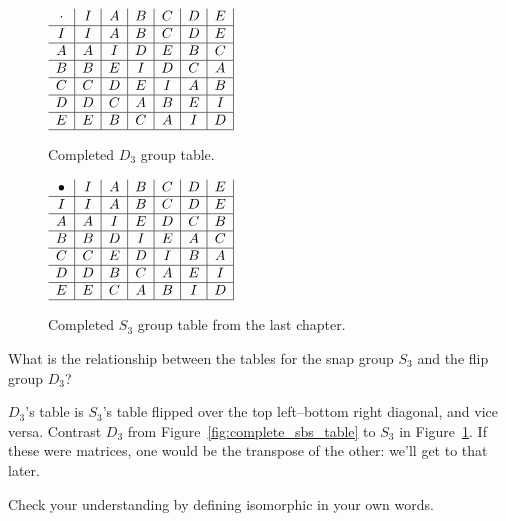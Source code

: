 \documentclass[../gatm_answers.tex]{subfiles}
\begin{document}
\begin{figure}[h]
\begin{minipage}{0.45\textwidth}
\centering
$\begin{array}{c|c|c|c|c|c|c|}
\cdot & I & A & B & C & D & E \\ \hline
I & I & A & B & C & D & E \\ \hline
A & A & I & D & E & B & C \\ \hline
B & B & E & I & D & C & A \\ \hline
C & C & D & E & I & A & B \\ \hline
D & D & C & A & B & E & I \\ \hline
E & E & B & C & A & I & D \\ \hline
\end{array}$
\caption{Completed $D_3$ group table.}
\label{fig:complete_sbs_table}
\end{minipage}\hfill
\begin{minipage}{0.45\textwidth}
\centering
$\begin{array}{c|c|c|c|c|c|c|}
\bullet & I & A & B & C & D & E \\ \hline
I & I & A & B & C & D & E \\ \hline
A & A & I & E & D & C & B \\ \hline
B & B & D & I & E & A & C \\ \hline
C & C & E & D & I & B & A \\ \hline
D & D & B & C & A & E & I \\ \hline
E & E & C & A & B & I & D \\ \hline
\end{array}$
\caption{Completed $S_3$ group table from the last chapter.}
\label{fig:complete_sts_table}
\end{minipage}
\end{figure}

\begin{outer_problem}
\item What is the relationship between the tables for the snap group $S_3$ and the flip group $D_3$?
\end{outer_problem}

$D_3$'s table is $S_3$'s table flipped over the top left--bottom right diagonal, and vice versa. Contrast $D_3$ from Figure~\ref{fig:complete_sbs_table} to $S_3$ in Figure~\ref{fig:complete_sts_table}. If these were matrices, one would be the transpose of the other: we'll get to that later.

\begin{outer_problem}
\item Check your understanding by defining isomorphic in your own words.
\end{outer_problem}
\end{document}
